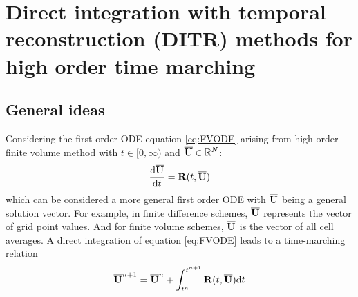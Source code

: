 \documentclass[preprint,12pt]{elsarticle}
\begin{document}


\section{Direct integration with temporal reconstruction (DITR) 
methods for high order time marching}
\label{sec:HIRK}

\subsection{General ideas}

Considering the first order ODE equation \eqref{eq:FVODE} arising
from high-order finite volume method
with
$t\in[0,\infty)$ and $\overline{\mathbf{U}}\in \mathbb{R}^N$:
\begin{equation*}
    \frac{\dd \overline{\mathbf{U}}}{\dd t} = \mathbf{R}(t, \overline{\mathbf{U}})
\end{equation*}
which can be
considered a more general first order ODE with $\overline{\mathbf{U}}$ being
a general solution vector. 
For example, in finite difference schemes,
$\overline{\mathbf{U}}$ represents the vector of grid point values.
And for finite volume schemes, $\overline{\mathbf{U}}$ is the vector 
of all cell averages.
A direct integration of equation \eqref{eq:FVODE}
leads to a time-marching relation
\begin{equation}
    \overline{\mathbf{U}}^{n+1} = \overline{\mathbf{U}}^{n} + \int_{t^n}^{t^{n+1}}{
    \mathbf{R}(t, \overline{\mathbf{U}}) \dd t
    }
    \label{eq:DI}
\end{equation}
\end{document}
